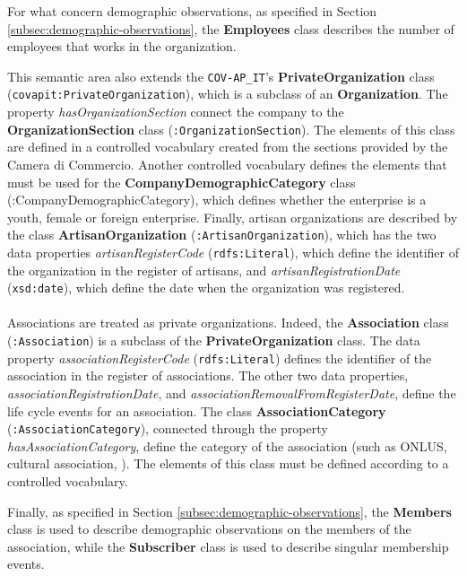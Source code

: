 For what concern demographic observations, as specified in Section \ref{subsec:demographic-observations}, the \textbf{Employees} class describes the number of employees that works in the organization.

This semantic area also extends the \verb#COV-AP_IT#'s \textbf{PrivateOrganization} class (\verb#covapit:PrivateOrganization#), which is a subclass of an \textbf{Organization}. The property \textit{hasOrganizationSection} connect the company to the \textbf{OrganizationSection} class (\verb#:OrganizationSection#). The elements of this class are defined in a controlled vocabulary created from the sections provided by the Camera di Commercio. Another controlled vocabulary defines the elements that must be used for the \textbf{CompanyDemographicCategory} class (:CompanyDemographicCategory), which defines whether the enterprise is a youth, female or foreign enterprise. Finally, artisan organizations are described by the class \textbf{ArtisanOrganization} (\verb#:ArtisanOrganization#), which has the two data properties \textit{artisanRegisterCode} (\verb#rdfs:Literal#), which define the identifier of the organization in the register of artisans, and \textit{artisanRegistrationDate} (\verb#xsd:date#), which define the date when the organization was registered.

\paragraph*{}
Associations are treated as private organizations. Indeed, the \textbf{Association} class (\verb#:Association#) is a subclass of the \textbf{PrivateOrganization} class. The data property \textit{associationRegisterCode} (\verb#rdfs:Literal#) defines the identifier of the association in the register of associations. The other two data properties, \textit{associationRegistrationDate}, and \textit{associationRemovalFromRegisterDate}, define the life cycle events for an association.
The class \textbf{AssociationCategory} (\verb#:AssociationCategory#), connected through the property \textit{hasAssociationCategory}, define the category of the association (such as ONLUS, cultural association, \etc). The elements of this class must be defined according to a controlled vocabulary.

Finally, as specified in Section \ref{subsec:demographic-observations}, the \textbf{Members} class is used to describe demographic observations on the members of the association, while the \textbf{Subscriber} class is used to describe singular membership events.

